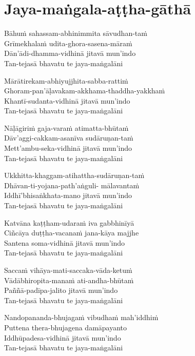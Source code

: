 
\clearpage

\chapter{Jaya-maṅgala-aṭṭha-gāthā}%


\begin{paritta}
Bāhuṁ sahassam-abhinimmita sāvudhan-taṁ\\
Grīmekhalaṁ udita-ghora-sasena-māraṁ\\
Dān'ādi-dhamma-vidhinā jitavā mun'indo\\
Tan-tejasā bhavatu te jaya-maṅgalāni

Mārātirekam-abhiyujjhita-sabba-rattiṁ\\
Ghoram-pan'āḷavakam-akkhama-thaddha-yakkhaṁ\\
Khantī-sudanta-vidhinā jitavā mun'indo\\
Tan-tejasā bhavatu te jaya-maṅgalāni

Nāḷāgiriṁ gaja-varaṁ atimatta-bhūtaṁ\\
Dāv'aggi-cakkam-asanīva sudāruṇan-taṁ\\
Mett'ambu-seka-vidhinā jitavā mun'indo\\
Tan-tejasā bhavatu te jaya-maṅgalāni

Ukkhitta-khaggam-atihattha-sudāruṇan-taṁ\\
Dhāvan-ti-yojana-path'aṅguli- mālavantaṁ\\
Iddhī'bhisaṅkhata-mano jitavā mun'indo\\
Tan-tejasā bhavatu te jaya-maṅgalāni

Katvāna kaṭṭham-udaraṁ iva gabbhinīyā\\
Ciñcāya duṭṭha-vacanaṁ jana-kāya majjhe\\
Santena soma-vidhinā jitavā mun'indo\\
Tan-tejasā bhavatu te jaya-maṅgalāni

Saccaṁ vihāya-mati-saccaka-vāda-ketuṁ\\
Vādābhiropita-manaṁ ati-andha-bhūtaṁ\\
Paññā-padīpa-jalito jitavā mun'indo\\
Tan-tejasā bhavatu te jaya-maṅgalāni

Nandopananda-bhujagaṁ vibudhaṁ mah'iddhiṁ\\
Puttena thera-bhujagena damāpayanto\\
Iddhūpadesa-vidhinā jitavā mun'indo\\
Tan-tejasā bhavatu te jaya-maṅgalāni


\end{paritta}
